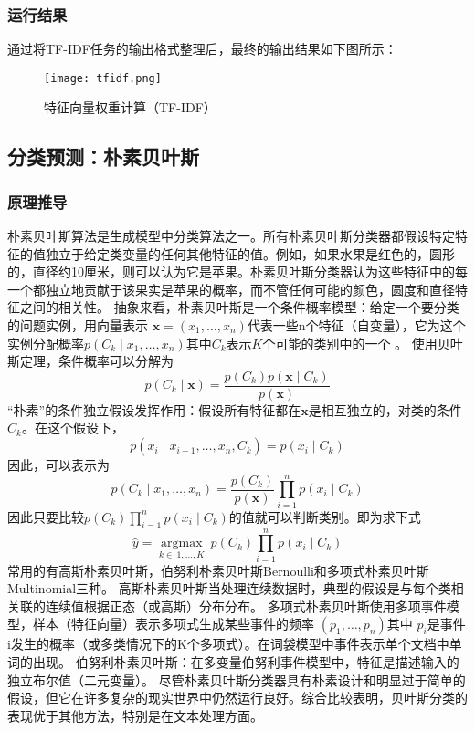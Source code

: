 \documentclass[lang=cn,11pt]{elegantpaper}
\begin{document}
\subsubsection{运行结果}
通过将TF-IDF任务的输出格式整理后，最终的输出结果如下图所示：
\begin{figure}[!htbp]
	\centering
	\texttt{[image: tfidf.png]}
	\caption{特征向量权重计算（TF-IDF） \label{fig:tfidf}}
\end{figure}
\subsection{分类预测：朴素贝叶斯}
\subsubsection{原理推导}
朴素贝叶斯算法是生成模型中分类算法之一。所有朴素贝叶斯分类器都假设特定特征的值独立于给定类变量的任何其他特征的值。例如，如果水果是红色的，圆形的，直径约10厘米，则可以认为它是苹果。朴素贝叶斯分类器认为这些特征中的每一个都独立地贡献于该果实是苹果的概率，而不管任何可能的颜色，圆度和直径特征之间的相关性。
抽象来看，朴素贝叶斯是一个条件概率模型：给定一个要分类的问题实例，用向量表示 $ \mathbf {x} =(x_ {1} , \dots, x_ {n})$代表一些n个特征（自变量），它为这个实例分配概率$p(C_ {k} \mid x_ {1}, \dots, x_ {n})$其中$C_{k}$表示$K$个可能的类别中的一个 。
使用贝叶斯定理，条件概率可以分解为
$$p(C_ {k} \mid \mathbf {x})= {\frac {p(C_ {k})p (\mathbf {x} \mid C_ {k})} {p(\mathbf {x} )}}$$
“朴素”的条件独立假设发挥作用：假设所有特征都在$\mathbf {x}$是相互独立的，对类的条件$ C_ {k}$。在这个假设下，
$$p(x_ {i}\mid x_ {i+1},\dots,x_ {n},C_ {k})= p(x_ {i} \mid C_ {k})$$
因此，可以表示为
$$p(C_ {k} \mid x_ {1},\dots,x_ {n})= \frac{p(C_ {k})}{p(\mathbf {x})}\prod_ {i = 1}^{n} p(x_ {i} \mid C_ {k})$$
因此只要比较$p(C_ {k})\prod_ {i = 1}^{n} p(x_ {i} \mid C_ {k})$的值就可以判断类别。即为求下式
$$\hat{y} = {\underset {k \in \ {1,\dots,K}} {\operatorname {argmax}}} \ p(C_ {k})\prod_{i = 1} ^ {n} p(x_ {i} \mid C_ {k})$$
常用的有高斯朴素贝叶斯，伯努利朴素贝叶斯Bernoulli和多项式朴素贝叶斯Multinomial三种。
高斯朴素贝叶斯当处理连续数据时，典型的假设是与每个类相关联的连续值根据正态（或高斯）分布分布。
多项式朴素贝叶斯使用多项事件模型，样本（特征向量）表示多项式生成某些事件的频率 $(p_ {1},\dots,p_ {n})$其中 $p_i$是事件i发生的概率（或多类情况下的K个多项式）。在词袋模型中事件表示单个文档中单词的出现。
伯努利朴素贝叶斯：在多变量伯努利事件模型中，特征是描述输入的独立布尔值（二元变量）。
尽管朴素贝叶斯分类器具有朴素设计和明显过于简单的假设，但它在许多复杂的现实世界中仍然运行良好。综合比较表明，贝叶斯分类的表现优于其他方法，特别是在文本处理方面。
\end{document}
